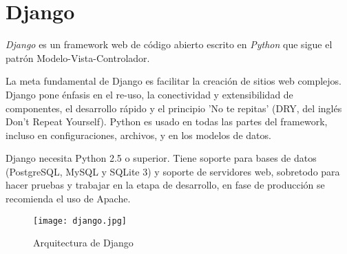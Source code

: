 \section{Django}

\textit{Django} \cite{URL::Django} es un framework web de código abierto escrito en \textit{Python} \cite{URL::Python} que sigue el patrón Modelo-Vista-Controlador. 
\newline

La meta fundamental de Django es facilitar la creación de sitios web complejos. 
Django pone énfasis en el re-uso, la conectividad y extensibilidad de componentes, el desarrollo rápido y 
el principio 'No te repitas' (DRY, del inglés Don't Repeat Yourself). Python es usado en todas las partes del 
framework, incluso en configuraciones, archivos, y en los modelos de datos.
\newline

Django necesita Python 2.5 o superior. Tiene soporte para bases de datos (PostgreSQL, MySQL y SQLite 3) y soporte de servidores web, sobretodo 
para hacer pruebas y trabajar en la etapa de desarrollo, en fase de producción se recomienda el uso de Apache.


\begin{figure}[h]
	\centering
	\texttt{[image: django.jpg]}
	\caption{Arquitectura de Django}
	\label{fig:ejemplo}
\end{figure}


